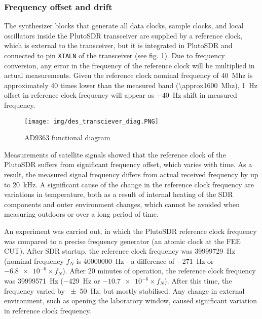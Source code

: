 \subsubsection{Frequency offset and drift}
\label{s_des_offset_drift}
The synthesizer blocks that generate all data clocks, sample clocks, and local oscillators inside the PlutoSDR transceiver are supplied by a reference clock, which is external to the transceiver, but it is integrated in PlutoSDR and connected to pin \texttt{XTALN} of the transceiver (see fig. \ref{f_des_transciever_diag})\cite{des07}. Due to frequency conversion, any error in the frequency of the reference clock will be multiplied in actual measurements. Given the reference clock nominal frequency of \qty{40}{Mhz} is approximately 40 times lower than the measured band (\qty{\approx1600}{Mhz}), \qty{1}{Hz} offset in reference clock frequency will appear as \qty{-40}{Hz} shift in measured frequency.

\begin{figure}
    \centering
    \texttt{[image: img/des\_transciever\_diag.PNG]}
    \caption{AD9363 functional diagram\cite{des07}}
    \label{f_des_transciever_diag}
\end{figure}

Measurements of satellite signals showed that the reference clock of the PlutoSDR suffers from significant frequency offset, which varies with time. As a result, the measured signal frequency differs from actual received frequency by up to \qty{20}{kHz}. A significant cause of the change in the reference clock frequency are variations in temperature, both as a result of internal heating of the SDR components and outer environment changes, which cannot be avoided when measuring outdoors or over a long period of time.

An experiment was carried out, in which the PlutoSDR reference clock frequency was compared to a precise frequency generator (an atomic clock at the FEE CUT). After SDR startup, the reference clock frequency was \qty{39999729}{Hz} (nominal frequency  $f_N$ is \qty{40000000}{Hz} - a difference of \qty{-271}{Hz} or $\num{-6.8e-6} \times f_N$). After 20 minutes of operation, the reference clock frequency was  \qty{39999571}{Hz} (\qty{-429}{Hz} or $\num{-10.7e-6} \times f_N$). After this time, the frequency varied by \qty{\pm 50}{Hz}, but mostly stabilised. Any change in external environment, such as opening the laboratory window, caused significant variation in reference clock frequency.

